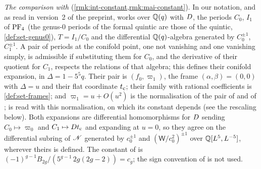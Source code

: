 \emph{The comparison with \cite{CGYZ26}} (\cref{rmk:int-constant,rmk:mai-constant}). In our notation, and as read in version~2 of the preprint, \cite[Def.~1.1]{CGYZ26} works over $\mathbb{Q}(q)$ with $D$, the periods $C_0$, $I_1$ of $\mathrm{PF}_{4}$ (the genus-$0$ periods of the formal quintic are those of the quintic, \cref{def:set-genus0}), $T=I_1/C_0$ and the differential $\mathbb{Q}(q)$-algebra generated by $C_0^{\pm1}$, $C_1^{\pm1}$. A pair of periods at the conifold point, one not vanishing and one vanishing simply, is admissible \cite[Def.~1.2]{CGYZ26} if substituting them for $C_0$, and the derivative of their quotient for $C_1$, respects the relations of that algebra; this defines their conifold expansion, in $\Delta=1-5^5q$. Their pair \cite[Ex.~1.3]{CGYZ26} is $(f_0,\varpi_1)$, the frame $(\alpha,\beta)=(0,0)$ with $\Delta=u$ and their flat coordinate $t_{\mathrm{c}}$; their family \cite[Rem.~1.4]{CGYZ26} with rational coefficients is \cref{def:set-frames}; and $\varpi_1=u+O(u^2)$ is the normalisation of the pair of \cite[Ex.~1.3]{CGYZ26} and of \cite[Def.~1.8\,(2); \S4.2, Prop.-Def.~4.5\,(1)]{CGYZ26}; \cite[Conj.~1.5]{CGYZ26} is read with this normalisation, on which its constant depends (see the rescaling below). Both expansions are differential homomorphisms for $D$ sending $C_0\mapsto\varpi_0$ and $C_1\mapsto Dt_{\mathrm{c}}$ and expanding at $u=0$, so they agree on the differential subring of $\mathscr{N}$ generated by $c_0^{\pm1}$ and $(\mathsf W/c_0^2)^{\pm1}$ over $\mathbb{Q}[L^5,L^{-5}]$, wherever theirs is defined. The constant of \cite[Conj.~1.5]{CGYZ26} is $(-1)^{g-1}B_{2g}/(5^{g-1}\,2g(2g-2))=c_g$; the sign convention of \cite[Def.~1.8]{CGYZ26} is not used.

